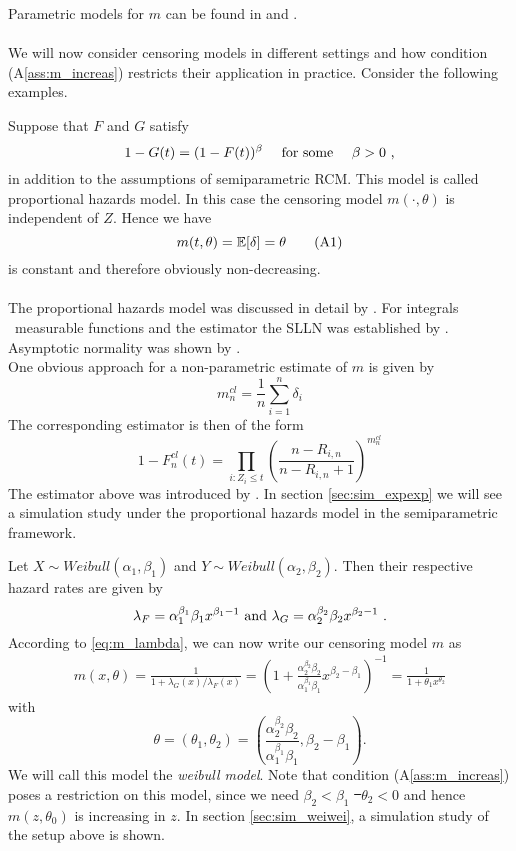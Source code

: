 %
Parametric models for $m$ can be found in \cite{cox1970binary} and \cite{collett2014modelling}.\\
\\
We will now consider censoring models in different settings and how condition (A\ref{ass:m_increas}) restricts their application in practice. Consider the following examples.
%
\begin{example}\label{ex:intro_phm}
	Suppose that $F$ and $G$ satisfy 
	$$1-G(t) = (1-F(t))^\beta \quad \textrm{ for some }\quad \beta > 0\textrm{ ,}$$
	in addition to the assumptions of semiparametric RCM. This model is called proportional hazards model. In this case the censoring model $m(\cdot, \theta)$ is independent of $Z$. Hence we have
	\begin{equation*}
		m(t,\theta) = \E[\delta] = \theta \numberthis\label{eq:model_phm}
	\end{equation*}
	is constant and therefore obviously non-decreasing. \\
	\\
	The proportional hazards model was discussed in detail by \cite{koziol1976cramer}. For integrals \wrt\ measurable functions and the estimator the SLLN was established by \cite{stute1992strong}. Asymptotic normality was shown by \cite{dikta1995asymptotic}.\\
	One obvious approach for a non-parametric estimate of $m$ is given by
	$$m^{cl}_n = \frac{1}{n} \sum_{i=1}^{n} \delta_i$$
	The corresponding estimator is then of the form
	$$1-F^{cl}_n(t) = \prod_{i:Z_i\leq t}\left( \frac{n-R_{i,n}}{n-R_{i,n}+1} \right)^{m^{cl}_n}$$
	The estimator above was introduced by \cite{cheng1987mle}. In section \ref{sec:sim_expexp} we will see a simulation study under the proportional hazards model in the semiparametric framework.%
\end{example}
%
\begin{example}
	Let $X \sim Weibull(\alpha_1, \beta_1)$ and $Y \sim Weibull(\alpha_2, \beta_2)$. Then their respective hazard rates are given by 
	$$\lambda_F = \alpha_1^{\beta_1}\beta_1 x^{\beta_1-1} \textrm{ and } \lambda_G = \alpha_2^{\beta_2}\beta_2 x^{\beta_2 -1}\textrm{ .}$$
	According to \eqref{eq:m_lambda}, we can now write our censoring model $m$ as 
	\begin{align*}
		m(x,\theta) = \frac{1}{1+\lambda_G(x)/\lambda_F(x)} =\left(1+\frac{\alpha_2^{\beta_2}\beta_2 }{\alpha_1^{\beta_1}\beta_1} x^{\beta_2-\beta_1}\right)^{-1} = \frac{1}{1+\theta_1 x^{\theta_2}}
	\end{align*}
	with
	$$\theta=(\theta_1,\theta_2)=\left(\frac{\alpha_2^{\beta_2}\beta_2 }{\alpha_1^{\beta_1}\beta_1},\beta_2-\beta_1\right)\textrm{.}$$
	We will call this model the \textit{weibull model}. Note that condition (A\ref{ass:m_increas}) poses a restriction on this model, since we need $\beta_2 < \beta_1$ \st\ $\theta_2 < 0$ and hence $m(z,\theta_0)$ is increasing in $z$. In section \ref{sec:sim_weiwei}, a simulation study of the setup above is shown.
\end{example}
